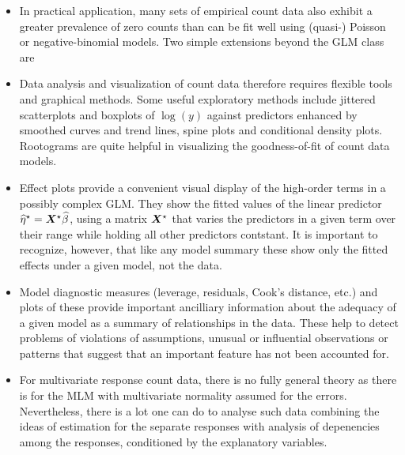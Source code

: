 \begin{itemize}
  \item In practical application, many sets of empirical count data also exhibit a greater prevalence of
  zero counts than can be fit well using (quasi-) Poisson or negative-binomial models.  Two simple 
  extensions beyond the GLM class are
  
  \item Data analysis and visualization of count data therefore requires  flexible tools and graphical
  methods.  Some useful exploratory methods include jittered scatterplots and boxplots of $\log(y)$
  against predictors enhanced by smoothed curves and trend lines, spine plots and conditional density plots.
  Rootograms are quite helpful in visualizing the goodness-of-fit of count data models.
  
  \item Effect plots provide a convenient visual display of the high-order terms in a possibly complex GLM.
  They show the fitted values of the linear predictor $\widehat{\eta}^\star = \bm{X}^\star \widehat{\beta}$,
  using a matrix $\bm{X}^\star$ that varies the predictors in a given term over their range while holding
  all other predictors contstant.  It is important to recognize, however, that like any model summary
  these show only the fitted
  effects under a given model, not the data.
  
  \item Model diagnostic measures (leverage, residuals, Cook's distance, etc.) and plots of these provide
  important ancilliary information about the adequacy of a given model as a summary of relationships in the
  data.  These help to detect problems of violations of assumptions, unusual or influential observations
  or patterns that suggest that an important feature has not been accounted for.
  
  \item For multivariate response count data, there is no fully general theory as there is for the
  MLM with multivariate normality assumed for the errors. 
  Nevertheless, there is a lot one can do to analyse such data combining the ideas of estimation for
  the separate responses with analysis of depenencies among the responses, conditioned by the
  explanatory variables.


\end{itemize}
